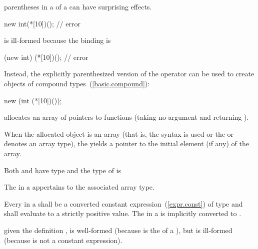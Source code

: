 \pnum
\begin{note}
%
parentheses in a  of a 
can have surprising effects.
\begin{example}

\begin{codeblock}
new int(*[10])();               // error
\end{codeblock}

is ill-formed because the binding is

\begin{codeblock}
(new int) (*[10])();            // error
\end{codeblock}

Instead, the explicitly parenthesized version of the 
operator can be used to create objects of compound
types~(\ref{basic.compound}):

\begin{codeblock}
new (int (*[10])());
\end{codeblock}

allocates an array of  pointers to functions (taking no
argument and returning ).
\end{example}
\end{note}

\pnum
{}%
When the allocated object is an array (that is, the
 syntax is used or the
 or  denotes an array type), the
 yields a pointer to the initial element (if
any) of the array.
\begin{note}
Both  and  have type  and
the type of  is 
\end{note}
The  in a  appertains
to the associated array type.

\pnum
Every  in a
 shall be a converted constant
expression~(\ref{expr.const}) of type  and
shall evaluate to a strictly positive value.
%
The  in a is
implicitly converted to .
\begin{example}
given the definition ,
 is well-formed (because  is the
 of a ), but
 is ill-formed (because  is not a
constant expression).
\end{example}

